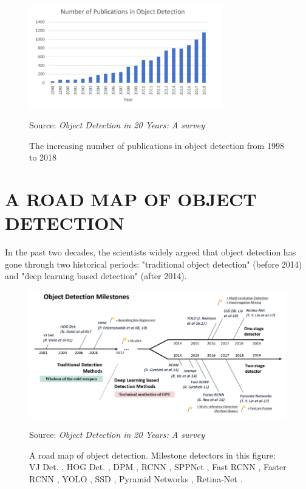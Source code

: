 \documentclass[12pt]{article}
\newcommand{\source}[1]{\caption*{Source: \emph{#1}} }
\begin{document}
\begin{figure}[htp]
    \centering
    \includegraphics[width=0.75\textwidth]{images/number_of_publication.png}
    \caption{The increasing number of publications in object detection from 1998 to 2018}
    \label{fig:publication}
    \source{Object Detection in 20 Years: A survey \cite{zou2019object}}
\end{figure}


\section{A ROAD MAP OF OBJECT DETECTION}
\label{sec:roadmap}
In the past two decades, the scientists widely argeed that object detection has 
gone through two historical periods: "traditional object detection" (before 2014)
and "deep learning based detection" (after 2014). 

\begin{figure}[htp]
    \centering
    \includegraphics[width=1\textwidth]{images/roadmap.png}
    \caption{
        A road map of object detection. Milestone detectors in this figure: 
        VJ Det. \cite{viola2001rapid, viola2004robust}, 
        HOG Det. \cite{dalal2005histograms}, 
        DPM \cite{felzenszwalb2008discriminatively, felzenszwalb2010cascade, felzenszwalb2009object}, 
        RCNN \cite{girshick2014rich}, SPPNet \cite{he2015spatial},
        Fast RCNN \cite{wang2017fast}, 
        Faster RCNN \cite{ren2015faster}, 
        YOLO \cite{redmon2016you}, 
        SSD \cite{liu2016ssd}, 
        Pyramid Networks \cite{lin2017feature}, 
        Retina-Net \cite{lin2017focal}.
    }
    \label{fig:roadmap}
    \source{Object Detection in 20 Years: A survey \cite{zou2019object}}
\end{figure}
\end{document}
